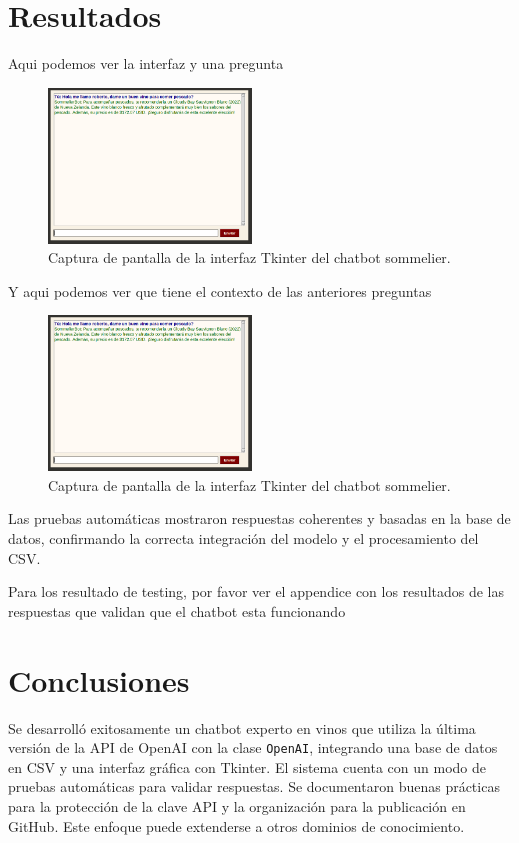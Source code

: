 \documentclass[conference]{IEEEtran}
\begin{document}
\section{Resultados}
Aqui podemos ver la interfaz y una pregunta
\begin{figure}[htbp]
\centerline{\includegraphics[width=0.48\textwidth]{./figures/2025-06-01-100101_701x537_scrot.png}}
\caption{Captura de pantalla de la interfaz Tkinter del chatbot sommelier.}
\label{fig:interfaz}
\end{figure}

Y aqui podemos ver que tiene el contexto de las anteriores preguntas
\begin{figure}[htbp]
\centerline{\includegraphics[width=0.48\textwidth]{./figures/2025-06-01-100101_701x537_scrot.png}}
\caption{Captura de pantalla de la interfaz Tkinter del chatbot sommelier.}
\label{memory}
\end{figure}
Las pruebas automáticas mostraron respuestas coherentes y basadas en la base de
datos, confirmando la correcta integración del modelo y el procesamiento del
CSV.

Para los resultado de testing, por favor ver el appendice con los resultados
de las respuestas que validan que el chatbot esta funcionando

\section{Conclusiones}

Se desarrolló exitosamente un chatbot experto en vinos que utiliza la última
versión de la API de OpenAI con la clase \texttt{OpenAI}, integrando una base
de datos en CSV y una interfaz gráfica con Tkinter. El sistema cuenta con un
modo de pruebas automáticas para validar respuestas. Se documentaron buenas
prácticas para la protección de la clave API y la organización para la
publicación en GitHub. Este enfoque puede extenderse a otros dominios de
conocimiento.
\end{document}
